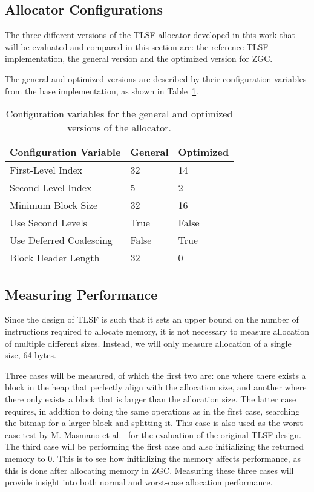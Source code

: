 \subsection{Allocator Configurations}

The three different versions of the TLSF allocator developed in this work that will be evaluated and compared in this section are: the reference TLSF implementation, the general version and the optimized version for ZGC. 

The general and optimized versions are described by their configuration variables from the base implementation, as shown in Table~\ref{table:configuration-variables}.

\begin{table}[H]
\centering
\begin{tabular}{lllll}
\hline
Configuration Variable  & General  & \multicolumn{3}{l}{Optimized} \\ \hline
First-Level Index       & 32       & \multicolumn{3}{l}{14}        \\
Second-Level Index      & 5        & \multicolumn{3}{l}{2}         \\
Minimum Block Size      & 32       & \multicolumn{3}{l}{16 }       \\
Use Second Levels       & True     & \multicolumn{3}{l}{False}     \\
Use Deferred Coalescing & False    & \multicolumn{3}{l}{True}      \\
Block Header Length     & 32       & \multicolumn{3}{l}{0}        
\end{tabular}
\caption{Configuration variables for the general and optimized versions of the allocator.}
\label{table:configuration-variables}
\end{table}

\subsection{Measuring Performance}

Since the design of TLSF is such that it sets an upper bound on the number of instructions required to allocate memory, it is not necessary to measure allocation of multiple different sizes. Instead, we will only measure allocation of a single size, 64 bytes. 

Three cases will be measured, of which the first two are: one where there exists a block in the heap that perfectly align with the allocation size, and another where there only exists a block that is larger than the allocation size. The latter case requires, in addition to doing the same operations as in the first case, searching the bitmap for a larger block and splitting it. This case is also used as the worst case test by M. Masmano et al.~\cite{TLSF} for the evaluation of the original TLSF design. The third case will be performing the first case and also initializing the returned memory to 0. This is to see how initializing the memory affects performance, as this is done after allocating memory in ZGC. Measuring these three cases will provide insight into both normal and worst-case allocation performance.

